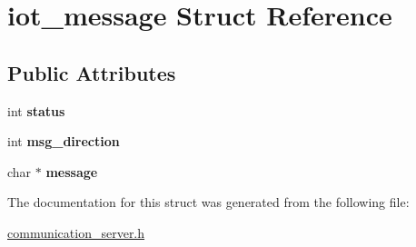 \hypertarget{structiot__message}{}\section{iot\+\_\+message Struct Reference}
\label{structiot__message}
\subsection*{Public Attributes}
\begin{DoxyCompactItemize}
\item 
int {\bfseries status}\hypertarget{structiot__message_a282cff6edd53458264e9c7c98124bded}{}\label{structiot__message_a282cff6edd53458264e9c7c98124bded}

\item 
int {\bfseries msg\+\_\+direction}\hypertarget{structiot__message_a8af140fd5b581ccd24e404d613843f23}{}\label{structiot__message_a8af140fd5b581ccd24e404d613843f23}

\item 
char $\ast$ {\bfseries message}\hypertarget{structiot__message_ababc192569f869f31e9ee5172c29670f}{}\label{structiot__message_ababc192569f869f31e9ee5172c29670f}

\end{DoxyCompactItemize}


The documentation for this struct was generated from the following file\+:\begin{DoxyCompactItemize}
\item 
\hyperlink{communication__server_8h}{communication\+\_\+server.\+h}\end{DoxyCompactItemize}
